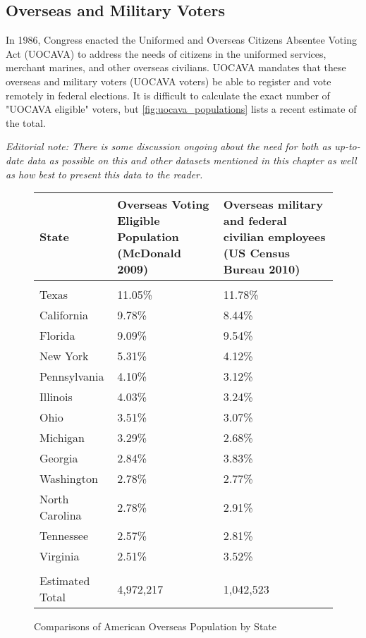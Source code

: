 \subsection{Overseas and Military Voters}
In 1986, Congress enacted the Uniformed and Overseas Citizens Absentee
Voting Act (UOCAVA) to address the needs of citizens in the uniformed
services, merchant marines, and other overseas civilians. UOCAVA
mandates that these overseas and military voters (UOCAVA voters) be
able to register and vote remotely in federal elections. It is
difficult to calculate the exact number of "UOCAVA eligible" voters,
but \autoref{fig:uocava_populations} lists a recent estimate of the
total.


\begin{center}
  \emph{Editorial note: There is some discussion ongoing about the
    need for both as up-to-date data as possible on this and other
    datasets mentioned in this chapter as well as how best to present
    this data to the reader.}
\end{center}  

\begin{figure}
\begin{center}
\begin{tabular}{l p{} p{}} %
  {\bf State} &
  {\bf Overseas Voting Eligible \newline Population} \newline(McDonald 2009) &
  {\bf Overseas military and federal \newline civilian employees}
  \newline(US Census Bureau 2010)\\\hline\\
Texas & 11.05\% & 11.78\%\\
California & 9.78\% & 8.44\% \\
Florida & 9.09\% & 9.54\% \\
New York & 5.31\% & 4.12\% \\
Pennsylvania & 4.10\% & 3.12\% \\
Illinois & 4.03\% & 3.24\% \\
Ohio & 3.51\% & 3.07\% \\
Michigan & 3.29\% & 2.68\% \\
Georgia & 2.84\% & 3.83\% \\
Washington & 2.78\% & 2.77\% \\
North Carolina & 2.78\% & 2.91\% \\
Tennessee & 2.57\% & 2.81\% \\
Virginia & 2.51\% & 3.52\% \\\hline\\
Estimated Total & 4,972,217 & 1,042,523
\end{tabular}
\end{center}
\caption{Comparisons of American Overseas Population by State}
\label{fig:uocava_populations} %
\end{figure}

